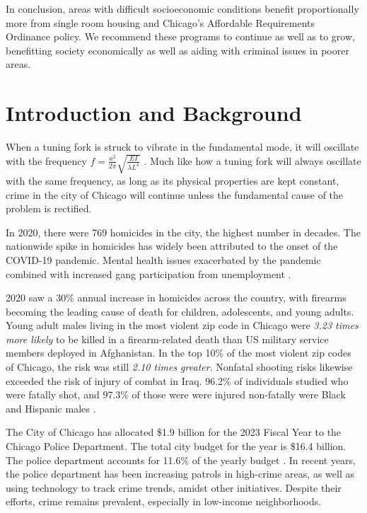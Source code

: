 \documentclass{article}
\begin{document}
\begin{onehalfspacing}
In conclusion, areas with difficult socioeconomic conditions benefit proportionally more from single room housing and Chicago's Affordable Requirements Ordinance policy. We recommend these programs to continue as well as to grow, benefitting society economically as well as aiding with criminal issues in poorer areas.

\pagebreak
\section{Introduction and Background}
\onehalfspacing
When a tuning fork is struck to vibrate in the fundamental mode, it will oscillate with the frequency $f=\frac{a^2}{2\pi}\sqrt{\frac{EI}{\lambda L^4}}$ \cite{Tkachenko}. Much like how a tuning fork will always oscillate with the same frequency, as long as its physical properties are kept constant, crime in the city of Chicago will continue unless the fundamental cause of the problem is rectified.

In 2020, there were 769 homicides in the city, the highest number in decades. The nationwide spike in homicides has widely been attributed to the onset of the COVID-19 pandemic. Mental health issues exacerbated by the pandemic combined with increased gang participation from unemployment \cite{covid-homicides}.

2020 saw a 30\% annual increase in homicides across the country, with firearms becoming the leading cause of death for children, adolescents, and young adults. Young adult males living in the most violent zip code in Chicago were \emph{3.23 times more likely} to be killed in a firearm-related death than US military service members deployed in Afghanistan. In the top 10\% of the most violent zip codes of Chicago, the risk was still \emph{2.10 times greater}. Nonfatal shooting risks likewise exceeded the risk of injury of combat in Iraq. 96.2\% of individuals studied who were fatally shot, and 97.3\% of those were were injured non-fatally were Black and Hispanic males \cite{10.1001/jamanetworkopen.2022.48132}.

The City of Chicago has allocated \$1.9 billion for the 2023 Fiscal Year to the Chicago Police Department. The total city budget for the year is \$16.4 billion. The police department accounts for 11.6\% of the yearly budget \cite{cpd-spending}. In recent years, the police department has been increasing patrols in high-crime areas, as well as using technology to track crime trends, amidst other initiatives. Despite their efforts, crime remains prevalent, especially in low-income neighborhoods.


\end{onehalfspacing}
\end{document}

